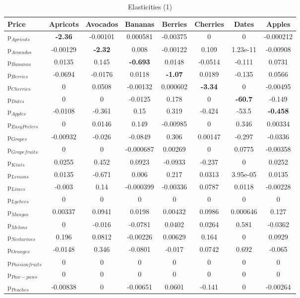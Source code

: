 \documentclass[11pt]{article}
\begin{document}
\begin{table}[h]
\caption{Elasticities (1)}
\label{table:elasticities 1}
\begin{center}
\begin{tabular}{lccccccc} \hline \hline
Price &Apricots &Avocados &Bananas &Berries &Cherries &Dates &Apples \\ \hline
p$_{Apricots}$ &\textbf{-2.36} &-0.00101 &0.000581 &-0.00375 &0 &0 &-0.000212 \\
p$_{Avocados}$ &-0.00129 &\textbf{-2.32} &0.008 &-0.00122 &0.109 &1.23e-11 &-0.00908 \\
p$_{Bananas}$ &0.0135 &0.145 &\textbf{-0.693} &0.0148 &-0.0514 &-0.111 &0.0731 \\
p$_{Berries}$ &-0.0694 &-0.0176 &0.0118 &\textbf{-1.07} &0.0189 &-0.135 &0.0566 \\
p$_{Cherries}$ &0 &0.0508 &-0.00132 &0.000602 &\textbf{-3.34} &0 &-0.00495 \\
p$_{Dates}$ &0 &0 &-0.0125 &0.178 &0 &\textbf{-60.7} &-0.149 \\
p$_{Apples}$ &-0.0108 &-0.361 &0.15 &0.319 &-0.424 &-53.5 &\textbf{-0.458} \\
p$_{Easy Peelers}$ &0 &0.0146 &0.149 &-0.00985 &0 &0.346 &0.00334 \\
p$_{Grapes}$ &-0.00932 &-0.026 &-0.0849 &0.306 &0.00147 &-0.297 &-0.0336 \\
p$_{Grapefruits}$ &0 &0 &-0.000687 &0.00269 &0 &0.0775 &-0.00358 \\
p$_{Kiwis}$ &0.0255 &0.452 &0.0923 &-0.0933 &-0.237 &0 &0.0252 \\
p$_{Lemons}$ &0.0135 &-0.671 &0.006 &0.217 &0.0313 &3.95e-05 &0.0135 \\
p$_{Limes}$ &-0.003 &0.14 &-0.000399 &-0.00336 &0.0787 &0.0118 &-0.00228 \\
p$_{Lychees}$ &0 &0 &0 &0 &0 &0 &0 \\
p$_{Mangos}$ &0.00337 &0.0941 &0.0198 &0.00432 &0.0986 &0.000646 &0.127 \\
p$_{Melons}$ &0 &-0.016 &-0.0781 &0.0402 &0.0264 &0.581 &-0.0362 \\
p$_{Nectarines}$ &0.196 &0.0812 &-0.00226 &0.00629 &0.164 &0 &0.0929 \\
p$_{Oranges}$ &-0.0148 &0.346 &-0.0801 &-0.017 &0.0742 &0.692 &-0.065 \\
p$_{Passion fruits}$ &0 &0 &0 &0 &0 &0 &0 \\
p$_{Paw-paws}$ &0 &0 &0 &0 &0 &0 &0 \\
p$_{Peaches}$ &-0.00838 &0 &-0.00651 &0.0601 &-0.141 &0 &-0.00264 \\

\end{tabular}
\end{center}
\end{table}
\end{document}
